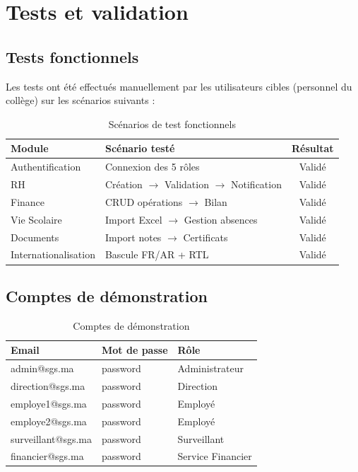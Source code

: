 \documentclass[12pt,a4paper]{report}
\newcommand{\cmark}{\ding{51}}  %
\begin{document}
\chapter{Tests et validation}

\section{Tests fonctionnels}

Les tests ont été effectués manuellement par les utilisateurs cibles (personnel du collège) sur les scénarios suivants :

\begin{table}[H]
\centering
\caption{Scénarios de test fonctionnels}
\label{tab:tests}
\begin{tabularx}{\textwidth}{lXc}
\toprule
\textbf{Module} & \textbf{Scénario testé} & \textbf{Résultat} \\
\midrule
Authentification & Connexion des 5 rôles & \cmark Validé \\
RH & Création $\rightarrow$ Validation $\rightarrow$ Notification & \cmark Validé \\
Finance & CRUD opérations $\rightarrow$ Bilan & \cmark Validé \\
Vie Scolaire & Import Excel $\rightarrow$ Gestion absences & \cmark Validé \\
Documents & Import notes $\rightarrow$ Certificats & \cmark Validé \\
Internationalisation & Bascule FR/AR + RTL & \cmark Validé \\
\bottomrule
\end{tabularx}
\end{table}

\section{Comptes de démonstration}

\begin{table}[H]
\centering
\caption{Comptes de démonstration}
\label{tab:demo}
\begin{tabularx}{\textwidth}{lll}
\toprule
\textbf{Email} & \textbf{Mot de passe} & \textbf{Rôle} \\
\midrule
admin@sgs.ma & password & Administrateur \\
direction@sgs.ma & password & Direction \\
employe1@sgs.ma & password & Employé \\
employe2@sgs.ma & password & Employé \\
surveillant@sgs.ma & password & Surveillant \\
financier@sgs.ma & password & Service Financier \\
\bottomrule
\end{tabularx}
\end{table}
\end{document}
